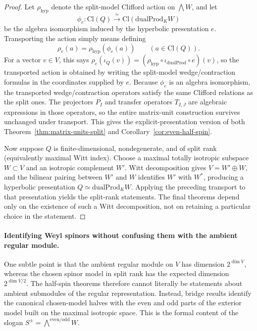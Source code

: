 \documentclass{birkjour}
\theoremstyle{plain}
\theoremstyle{definition}
\theoremstyle{remark}
\newcommand{\Cl}{\mathrm{Cl}}
\newcommand{\dualProd}{\mathrm{dualProd}}
\begin{document}
\begin{proof}
Let $\rho_{\mathrm{hyp}}$ denote the split-model Clifford action on
$\bigwedge W$, and let
\[
  \phi_e:\Cl(Q)\xrightarrow{\ \simeq\ }\Cl(\dualProd_K W)
\]
be the algebra isomorphism induced by the hyperbolic presentation $e$.
Transporting the action simply means defining
\[
  \rho_e(a)=\rho_{\mathrm{hyp}}(\phi_e(a))
  \qquad (a\in \Cl(Q)).
\]
For a vector $v\in V$, this says
\(\rho_e(\iota_Q(v)) = (\rho_{\mathrm{hyp}}\circ \iota_{\dualProd}\circ e)(v)\),
so the transported action is obtained by writing the split-model
wedge/contraction formulas in the coordinates supplied by $e$.
Because $\phi_e$ is an algebra isomorphism, the transported wedge/contraction
operators satisfy the same Clifford relations as the split ones. The
projectors $P_I$ and transfer operators $T_{I,J}$ are algebraic expressions in
those operators, so the entire matrix-unit construction survives unchanged
under transport. This gives the explicit-presentation version of both
Theorem~\ref{thm:matrix-units-split} and
Corollary~\ref{cor:even-half-spin}.

Now suppose $Q$ is finite-dimensional, nondegenerate, and of split rank
(equivalently maximal Witt index). Choose a maximal totally isotropic subspace $W\subset V$ and an
isotropic complement $W'$. Witt decomposition gives
$V=W'\oplus W$, and the bilinear pairing between $W'$ and $W$ identifies
$W'$ with $W^*$, producing a hyperbolic presentation
$Q\simeq \dualProd_K W$. Applying the preceding transport to that presentation
yields the split-rank statements. The final theorems depend only on the
existence of such a Witt decomposition, not on retaining a particular choice in
the statement.
\end{proof}

\paragraph{Identifying Weyl spinors without confusing them with the ambient
regular module.}
One subtle point is that the ambient regular module on $V$ has dimension
$2^{\dim V}$, whereas the chosen spinor model in split rank has the expected
dimension $2^{\dim V/2}$. The half-spin theorems therefore cannot literally be
statements about ambient submodules of the regular representation. Instead,
bridge results identify the canonical chosen-model halves with the even and odd
parts of the exterior model built on the maximal isotropic space. This is the
formal content of the slogan
$S^{\pm} = \bigwedge^{\mathrm{even}/\mathrm{odd}} W$.
\end{document}
